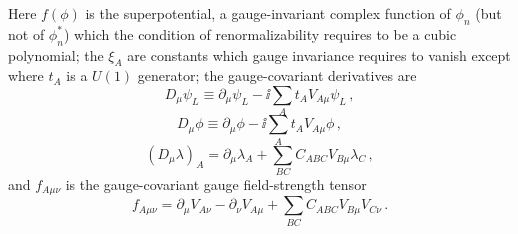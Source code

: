Here \(f(\phi)\) is the superpotential, a gauge-invariant complex function of
\(\phi_n\) (but not of \(\phi_n^*\)) which the condition of renormalizability
requires to be a cubic polynomial; the \(\xi_A\) are constants which gauge
invariance requires to vanish except where \(t_A\) is a \(U(1)\) generator;
the gauge-covariant derivatives are
\begin{equation}
  D_\mu\psi_L
  \equiv\partial_\mu\psi_L-\ii\sum_A t_A V_{A\mu}\psi_L\,,
  \tag{27.4.2}\label{eq:27.4.2}
\end{equation}
\begin{equation}
  D_\mu\phi
  \equiv\partial_\mu\phi-\ii\sum_A t_A V_{A\mu}\phi\,,
  \tag{27.4.3}\label{eq:27.4.3}
\end{equation}
\begin{equation}
  (D_\mu\lambda)_A
  =\partial_\mu\lambda_A+\sum_{BC}C_{ABC}V_{B\mu}\lambda_C\,,
  \tag{27.4.4}\label{eq:27.4.4}
\end{equation}
and \(f_{A\mu\nu}\) is the gauge-covariant gauge field-strength tensor
\begin{equation}
  f_{A\mu\nu}
  =\partial_\mu V_{A\nu}-\partial_\nu V_{A\mu}
  +\sum_{BC}C_{ABC}V_{B\mu}V_{C\nu}\,.
  \tag{27.4.5}\label{eq:27.4.5}
\end{equation}


